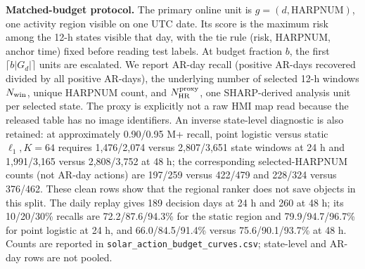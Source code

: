 \documentclass[11pt,a4paper]{article}
\numberwithin{equation}{section}
\theoremstyle{definition}\newtheorem{definition}[theorem]{Definition}
\theoremstyle{remark}\newtheorem{remark}[theorem]{Remark}
\begin{document}
\textbf{Matched-budget protocol.} The primary online unit is $g=(d,\mathrm{HARPNUM})$, one activity region visible on one UTC date. Its score is the maximum risk among the 12-h states visible that day, with the tie rule (risk, HARPNUM, anchor time) fixed before reading test labels. At budget fraction $b$, the first $\lceil b|G_d|\rceil$ units are escalated. We report AR-day recall (positive AR-days recovered divided by all positive AR-days), the underlying number of selected 12-h windows $N_{\rm win}$, unique HARPNUM count, and $N_{\rm HR}^{\rm proxy}$, one SHARP-derived analysis unit per selected state. The proxy is explicitly not a raw HMI map read because the released table has no image identifiers. An inverse state-level diagnostic is also retained: at approximately 0.90/0.95 M+ recall, point logistic versus static $\ell_1,K=64$ requires 1,476/2,074 versus 2,807/3,651 state windows at 24 h and 1,991/3,165 versus 2,808/3,752 at 48 h; the corresponding selected-HARPNUM counts (not AR-day actions) are 197/259 versus 422/479 and 228/324 versus 376/462. These clean rows show that the regional ranker does not save objects in this split. The daily replay gives 189 decision days at 24 h and 260 at 48 h; its 10/20/30\% recalls are 72.2/87.6/94.3\% for the static region and 79.9/94.7/96.7\% for point logistic at 24 h, and 66.0/84.5/91.4\% versus 75.6/90.1/93.7\% at 48 h. Counts are reported in \texttt{solar\_action\_budget\_curves.csv}; state-level and AR-day rows are not pooled.
\end{document}
